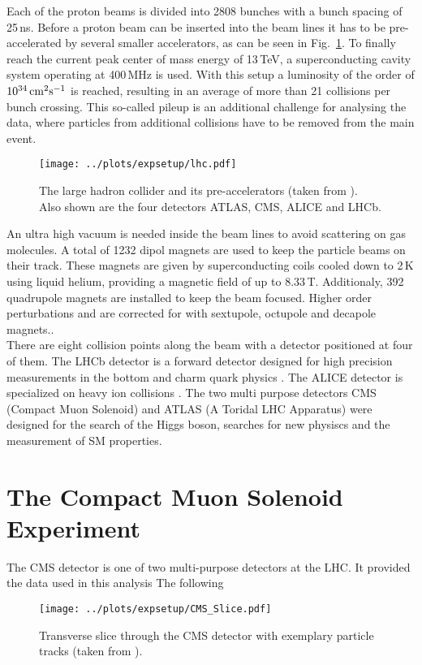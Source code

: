 \noindent Each of the proton beams is divided into 2808 bunches with a bunch spacing of 25\,ns. Before a proton beam can be inserted into the beam lines it has to be pre-accelerated by several smaller accelerators, as can be seen in Fig.~\ref{fig:expsetup:lhc}. To finally reach the current peak center of mass energy of 13\,TeV, a superconducting cavity system operating at 400\,MHz is used. With this setup a luminosity of the order of $10^{34}\,\rm{cm}^2\rm{s}^{-1}$ is reached, resulting in an average of more than 21 collisions per bunch crossing. This so-called pileup is an additional challenge for analysing the data, where particles from additional collisions have to be removed from the main event.\\
\begin{figure}[t]
	\centering
	\texttt{[image: ../plots/expsetup/lhc.pdf]}
	\caption[The large hadron collider]{The large hadron collider and its pre-accelerators (taken from \cite{lhc_fig}). Also shown are the four detectors ATLAS, CMS, ALICE and LHCb.}
	\label{fig:expsetup:lhc}
\end{figure}

\noindent An ultra high vacuum is needed inside the beam lines to avoid scattering on gas molecules. A total of 1232 dipol magnets are used to keep the particle beams on their track. These magnets are given by superconducting coils cooled down to 2\,K using liquid helium, providing a magnetic field of up to 8.33\,T. Additionaly, 392 quadrupole magnets are installed to keep the beam focused. Higher order perturbations and are corrected for with sextupole, octupole and decapole magnets..\\

\noindent There are eight collision points along the beam with a detector positioned at four of them. The LHCb detector is a forward detector designed for high precision measurements in the bottom and charm quark physics \cite{LHCB}. The ALICE detector is specialized on heavy ion collisions \cite{ALICE}. The two multi purpose detectors CMS (Compact Muon Solenoid) and ATLAS (A Toridal LHC Apparatus) were designed for the search of the Higgs boson, searches for new physiscs and the measurement of SM properties.

\section{The Compact Muon Solenoid Experiment}
The CMS detector is one of two multi-purpose detectors at the LHC. It provided the data used in this analysis The following
\begin{figure}
	\centering
	\texttt{[image: ../plots/expsetup/CMS\_Slice.pdf]}
	\caption[Transverse slice through the CMS detector]{Transverse slice through the CMS detector with exemplary particle tracks (taken from \cite{cms_slice}).}
	\label{fig:expsetup:cms_slice}
\end{figure}


